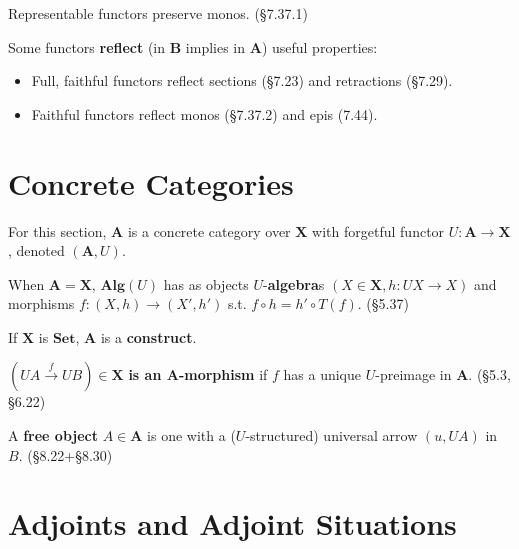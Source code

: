 \documentclass[10pt,twocolumn,letterpaper]{article}
\newcommand{\defn}[1]{{\bf #1}}
\begin{document}
  Representable functors preserve monos. (\S7.37.1)

  Some functors \defn{reflect} (in $\mathbf{B}$ implies in $\mathbf{A}$) useful properties:
  \begin{itemize}
      \item Full, faithful functors reflect sections (\S7.23) and retractions (\S7.29).
      \item Faithful functors reflect monos (\S7.37.2) and epis (7.44).
  \end{itemize}


\section{Concrete Categories}

  For this section, $\mathbf{A}$ is a concrete category over $\mathbf{X}$
  with forgetful functor $U : \mathbf{A} \to \mathbf{X}$, denoted $(\mathbf{A}, U)$.

  When $\mathbf{A} = \mathbf{X}$, $\mathbf{Alg}(U)$ has as objects
  $U$-\defn{algebra}s $(X \in \mathbf{X}, h : UX \to X)$ and morphisms
  $f : (X,h) \to (X',h')$ s.t. $f \circ h = h' \circ T(f)$. (\S5.37)

  If $\mathbf{X}$ is $\mathbf{Set}$, $\mathbf{A}$ is a \defn{construct}.

  $(UA \overset{f}{\to} UB) \in \mathbf{X}$ \defn{is an $\mathbf{A}$-morphism}
  if $f$ has a unique $U$-preimage in $\mathbf{A}$. (\S5.3, \S6.22)


  A \defn{free object} $A \in \mathbf{A}$ is one with a ($U$-structured)
  universal arrow $(u,UA)$ in $B$. (\S8.22+\S8.30)


\section{Adjoints and Adjoint Situations}
\end{document}
